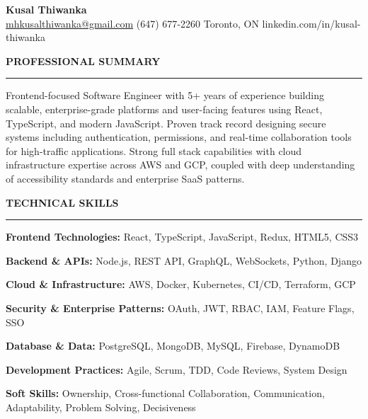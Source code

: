 \documentclass[10pt,letterpaper]{article}
\begin{document}
\begin{center}
{\LARGE\textbf{Kusal Thiwanka}}\\[3pt]
\href{mailto:mhkusalthiwanka@gmail.com}{mhkusalthiwanka@gmail.com}\hspace{2em}%
(647) 677{-}2260\hspace{2em}%
Toronto, ON\hspace{2em}
linkedin.com/in/kusal-thiwanka
\end{center}

\vspace{6pt}

\textbf{PROFESSIONAL SUMMARY}\\[-8pt]
\noindent\rule{\textwidth}{1pt}

\vspace{-2pt}

Frontend-focused Software Engineer with 5+ years of experience building scalable, enterprise-grade platforms and user-facing features using React, TypeScript, and modern JavaScript. Proven track record designing secure systems including authentication, permissions, and real-time collaboration tools for high-traffic applications. Strong full stack capabilities with cloud infrastructure expertise across AWS and GCP, coupled with deep understanding of accessibility standards and enterprise SaaS patterns.

\vspace{8pt}

\textbf{TECHNICAL SKILLS}\\[-8pt]
\noindent\rule{\textwidth}{1pt}

\vspace{-2pt}

\textbf{Frontend Technologies:} React, TypeScript, JavaScript, Redux, HTML5, CSS3

\textbf{Backend \& APIs:} Node.js, REST API, GraphQL, WebSockets, Python, Django

\textbf{Cloud \& Infrastructure:} AWS, Docker, Kubernetes, CI/CD, Terraform, GCP

\textbf{Security \& Enterprise Patterns:} OAuth, JWT, RBAC, IAM, Feature Flags, SSO

\textbf{Database \& Data:} PostgreSQL, MongoDB, MySQL, Firebase, DynamoDB

\textbf{Development Practices:} Agile, Scrum, TDD, Code Reviews, System Design

\textbf{Soft Skills:} Ownership, Cross-functional Collaboration, Communication, Adaptability, Problem Solving, Decisiveness
\end{document}
